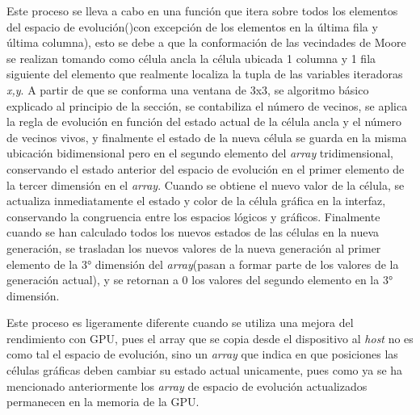 \documentclass[]{article}
\begin{document}
		Este proceso se lleva a cabo en una función que itera sobre todos los elementos del espacio de evolución()con excepción de los elementos en la última fila y última columna), esto se debe a que la conformación de las vecindades de Moore se realizan tomando como célula ancla la célula ubicada 1 columna y 1 fila siguiente del elemento que realmente localiza la tupla de las variables iteradoras \textit{x,y}. A partir de que se conforma una ventana de 3x3, se algoritmo básico explicado al principio de la sección, se contabiliza el número de vecinos, se aplica la regla de evolución en función del estado actual de la célula ancla y el número de vecinos vivos, y finalmente el estado de la nueva célula se guarda en la misma ubicación bidimensional pero en el segundo elemento del \textit{array} tridimensional, conservando el estado anterior del espacio de evolución en el primer elemento de la tercer dimensión en el \textit{array}. Cuando se obtiene el nuevo valor de la célula, se actualiza inmediatamente el estado y color de la célula gráfica en la interfaz, conservando la congruencia entre los espacios lógicos y gráficos. Finalmente cuando se han calculado todos los nuevos estados de las células en la nueva generación, se trasladan los nuevos valores de la nueva generación al primer elemento de la 3° dimensión del \textit{array}(pasan a formar parte de los valores de la generación actual), y se retornan a 0 los valores del segundo elemento en la 3° dimensión.
		
		Este proceso es ligeramente diferente cuando se utiliza una mejora del rendimiento con GPU, pues el array que se copia desde el dispositivo al \textit{host} no es como tal el espacio de evolución, sino un \textit{array} que indica en que posiciones las células gráficas deben cambiar su estado actual unicamente, pues como ya se ha mencionado anteriormente los \textit{array} de espacio de evolución actualizados permanecen en la memoria de la GPU.
		
\end{document}
